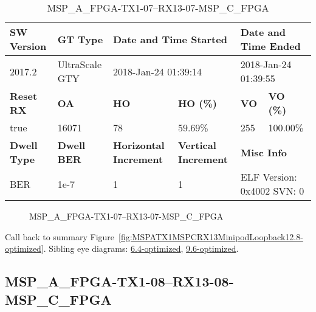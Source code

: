 \begin{table}[h]
\centering
\caption{MSP\_A\_FPGA-TX1-07--RX13-07-MSP\_C\_FPGA}
\label{tab:MSPAFPGATX107RX1307MSPCFPGA12.8-optimized}
\begin{tabular}{@{}|l|l|l|l|l|l|@{}}
\toprule
\textbf{SW Version}                & \textbf{GT Type}   & \multicolumn{2}{l|}{\textbf{Date and Time Started}}            & \multicolumn{2}{l|}{\textbf{Date and Time Ended}}        \\ \midrule
2017.2                       & UltraScale GTY          & \multicolumn{2}{l|}{2018-Jan-24 01:39:14}                   & \multicolumn{2}{l|}{2018-Jan-24 01:39:55}               \\ \midrule
\textbf{Reset RX}                  & \textbf{OA} & \textbf{HO}   & \textbf{HO (\%)} & \textbf{VO} & \textbf{VO (\%)} \\ \midrule
true & 16071        & 78          & 59.69\%        & 255        & 100.00\%       \\ \midrule
\textbf{Dwell Type}                & \textbf{Dwell BER} & \textbf{Horizontal Increment} & \textbf{Vertical Increment}    & \multicolumn{2}{l|}{\textbf{Misc Info}}                  \\ \midrule
BER                            & 1e-7        & 1        & 1           & \multicolumn{2}{l|}{ELF Version: 0x4002 SVN: 0}                         \\ \bottomrule
\end{tabular}
\end{table}

\begin{figure}[h]
\caption{MSP\_A\_FPGA-TX1-07--RX13-07-MSP\_C\_FPGA} \label{fig:MSPAFPGATX107RX1307MSPCFPGA12.8-optimized}
\end{figure}

Call back to summary Figure~\ref{fig:MSPATX1MSPCRX13MinipodLoopback12.8-optimized}.
Sibling eye diagrams: \hyperref[sec:MSPAFPGATX107RX1307MSPCFPGA6.4-optimized]{6.4-optimized}, \hyperref[sec:MSPAFPGATX107RX1307MSPCFPGA9.6-optimized]{9.6-optimized}.

\clearpage
\newpage


\subsection{MSP\_A\_FPGA-TX1-08--RX13-08-MSP\_C\_FPGA}\label{sec:MSPAFPGATX108RX1308MSPCFPGA12.8-optimized}

